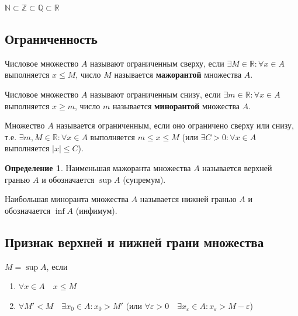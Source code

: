 \documentclass[a4paper,oneside]{article}
\theoremstyle{definition}
\newtheorem{definition}{Определение}[subsection]
\theoremstyle{definition}
\theoremstyle{definition}
\begin{document}
$\mathbb{N} \subset \mathbb{Z} \subset \mathbb{Q} \subset \mathbb{R}$

\subsection{Ограниченность}

Числовое множество $A$ называют ограниченным сверху, если 
$\exists M \in \mathbb{R}: \forall x \in A$ выполняется $x \le M$,
число $M$ называется \textbf{мажорантой} множества $A$.

Числовое множество $A$ называют ограниченным снизу, если 
$\exists m \in \mathbb{R}: \forall x \in A$ выполняется $x \ge m$,
число $m$ называется \textbf{минорантой} множества $A$.

Множество $A$ называется ограниченным, если оно ограничено сверху или снизу,
т.е. $\exists m, M \in \mathbb{R}: \forall x \in A$ выполняется $m \le x \le M$
(или $\exists C > 0: \forall x \in A$ выполняется $|x| \le C$).

\begin{definition}
    Наименьшая мажоранта множества $A$ называется верхней гранью $A$ и обозначается
    $\sup A$ (супремум).

    Наибольшая миноранта множества $A$ называется нижней гранью $A$ и обозначается
    $\inf A$ (инфимум).
\end{definition}



\subsection{Признак верхней и нижней грани множества}

$M = \sup A$, если 
\begin{enumerate}
    \item $\forall x \in A \quad x \le M$
    \item $\forall M' < M \quad \exists x_0 \in A: x_0 > M'$
    (или $\forall \varepsilon > 0 \quad \exists x_\varepsilon \in A: x_\varepsilon > M - \varepsilon$)
\end{enumerate}
\end{document}
